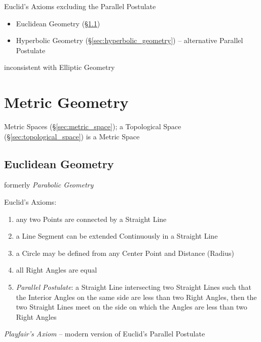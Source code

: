 Euclid's Axioms excluding the Parallel Postulate

\begin{itemize}
  \item Euclidean Geometry (\S\ref{sec:euclidean_geometry})
  \item Hyperbolic Geometry (\S\ref{sec:hyperbolic_geometry}) -- alternative
    Parallel Postulate
\end{itemize}

inconsistent with Elliptic Geometry



\section{Metric Geometry}\label{sec:metric_geometry}

Metric Spaces (\S\ref{sec:metric_space}); a Topological Space
(\S\ref{sec:topological_space}) is a Metric Space



\subsection{Euclidean Geometry}\label{sec:euclidean_geometry}

formerly \emph{Parabolic Geometry}

Euclid's Axioms:
\begin{enumerate}
  \item any two Points are connected by a Straight Line
  \item a Line Segment can be extended Continuously in a Straight Line
  \item a Circle may be defined from any Center Point and Distance (Radius)
  \item all Right Angles are equal
  \item \emph{Parallel Postulate}: a Straight Line intersecting two Straight
    Lines such that the Interior Angles on the same side are less than two Right
    Angles, then the two Straight Lines meet on the side on which the Angles are
    less than two Right Angles
\end{enumerate}

\emph{Playfair's Axiom} -- modern version of Euclid's Parallel Postulate

